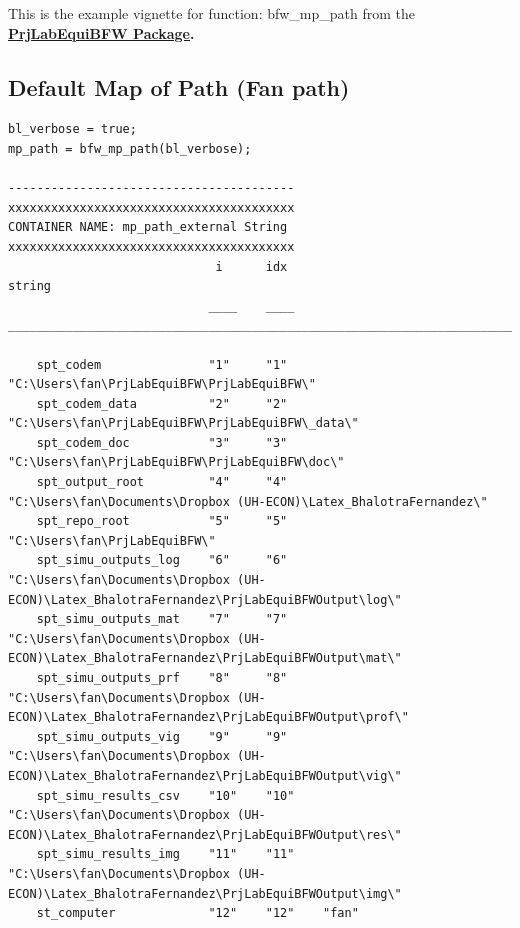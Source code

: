 \documentclass[
]{book}
\begin{document}
This is the example vignette for function: bfw\_mp\_path from the
\href{https://fanwangecon.github.io/PrjLabEquiBFW/}{\textbf{PrjLabEquiBFW
Package}}\textbf{.}

\hypertarget{default-map-of-path-fan-path}{%
\subsection{Default Map of Path (Fan path)}\label{default-map-of-path-fan-path}}

\begin{verbatim}
bl_verbose = true;
mp_path = bfw_mp_path(bl_verbose);

----------------------------------------
xxxxxxxxxxxxxxxxxxxxxxxxxxxxxxxxxxxxxxxx
CONTAINER NAME: mp_path_external String
xxxxxxxxxxxxxxxxxxxxxxxxxxxxxxxxxxxxxxxx
                             i      idx                                                string                                           
                            ____    ____    ____________________________________________________________________________________________

    spt_codem               "1"     "1"     "C:\Users\fan\PrjLabEquiBFW\PrjLabEquiBFW\"                                                 
    spt_codem_data          "2"     "2"     "C:\Users\fan\PrjLabEquiBFW\PrjLabEquiBFW\_data\"                                           
    spt_codem_doc           "3"     "3"     "C:\Users\fan\PrjLabEquiBFW\PrjLabEquiBFW\doc\"                                             
    spt_output_root         "4"     "4"     "C:\Users\fan\Documents\Dropbox (UH-ECON)\Latex_BhalotraFernandez\"                         
    spt_repo_root           "5"     "5"     "C:\Users\fan\PrjLabEquiBFW\"                                                               
    spt_simu_outputs_log    "6"     "6"     "C:\Users\fan\Documents\Dropbox (UH-ECON)\Latex_BhalotraFernandez\PrjLabEquiBFWOutput\log\" 
    spt_simu_outputs_mat    "7"     "7"     "C:\Users\fan\Documents\Dropbox (UH-ECON)\Latex_BhalotraFernandez\PrjLabEquiBFWOutput\mat\" 
    spt_simu_outputs_prf    "8"     "8"     "C:\Users\fan\Documents\Dropbox (UH-ECON)\Latex_BhalotraFernandez\PrjLabEquiBFWOutput\prof\"
    spt_simu_outputs_vig    "9"     "9"     "C:\Users\fan\Documents\Dropbox (UH-ECON)\Latex_BhalotraFernandez\PrjLabEquiBFWOutput\vig\" 
    spt_simu_results_csv    "10"    "10"    "C:\Users\fan\Documents\Dropbox (UH-ECON)\Latex_BhalotraFernandez\PrjLabEquiBFWOutput\res\" 
    spt_simu_results_img    "11"    "11"    "C:\Users\fan\Documents\Dropbox (UH-ECON)\Latex_BhalotraFernandez\PrjLabEquiBFWOutput\img\" 
    st_computer             "12"    "12"    "fan"                                                                                       
\end{verbatim}
\end{document}
